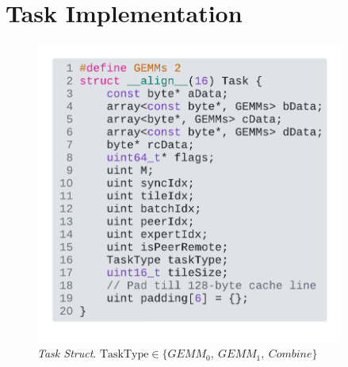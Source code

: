 \section{Task Implementation}\label{sec:task-implementation}
\begin{figure}[!ht]
    \centering
    \includegraphics[width=4in]{figures/task}
    \caption{\emph{Task Struct}. $\text{TaskType} \in \{GEMM_0,\>GEMM_1,\>Combine\}$}
    \label{fig:task}
\end{figure}